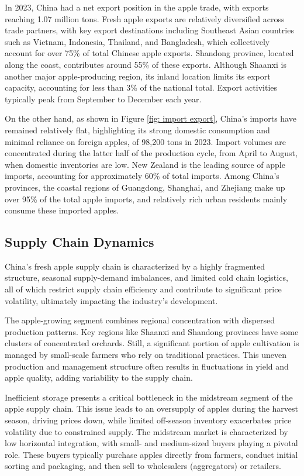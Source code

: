 In 2023, China had a net export position in the apple trade, with exports reaching 1.07 million tons. Fresh apple exports are relatively diversified across trade partners, with key export destinations including Southeast Asian countries such as Vietnam, Indonesia, Thailand, and Bangladesh, which collectively account for over 75\% of total Chinese apple exports. Shandong province, located along the coast, contributes around 55\% of these exports. Although Shaanxi is another major apple-producing region, its inland location limits its export capacity, accounting for less than 3\% of the national total. Export activities typically peak from September to December each year.

On the other hand, as shown in Figure \ref{fig: import export}, China’s imports have remained relatively flat, highlighting its strong domestic consumption and minimal reliance on foreign apples, of 98,200 tons in 2023.  Import volumes are concentrated during the latter half of the production cycle, from April to August, when domestic inventories are low. New Zealand is the leading source of apple imports, accounting for approximately 60\% of total imports. Among China's provinces, the coastal regions of Guangdong, Shanghai, and Zhejiang make up over 95\% of the total apple imports, and relatively rich urban residents mainly consume these imported apples.





    
\subsection{Supply Chain Dynamics}
\noindent China’s fresh apple supply chain is characterized by a highly fragmented structure, seasonal supply-demand imbalances, and limited cold chain logistics, all of which restrict supply chain efficiency and contribute to significant price volatility, ultimately impacting the industry’s development.

The apple-growing segment combines regional concentration with dispersed production patterns. Key regions like Shaanxi and Shandong provinces have some clusters of concentrated orchards. Still, a significant portion of apple cultivation is managed by small-scale farmers who rely on traditional practices. This uneven production and management structure often results in fluctuations in yield and apple quality, adding variability to the supply chain.

Inefficient storage presents a critical bottleneck in the midstream segment of the apple supply chain. This issue leads to an oversupply of apples during the harvest season, driving prices down, while limited off-season inventory exacerbates price volatility due to constrained supply. The midstream market is characterized by low horizontal integration, with small- and medium-sized buyers playing a pivotal role. These buyers typically purchase apples directly from farmers, conduct initial sorting and packaging, and then sell to wholesalers (aggregators) or retailers. 

